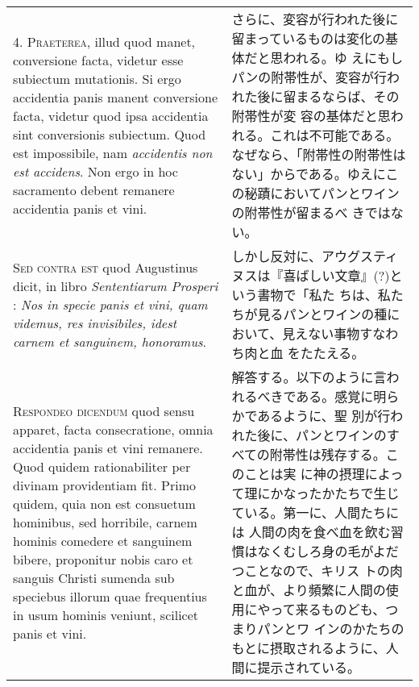\documentclass[10pt]{jsarticle} %
\begin{document}
\begin{longtable}{p{21em}p{21em}}
\\



4. {\scshape Praeterea}, illud quod manet, conversione facta, videtur
esse subiectum mutationis. Si ergo accidentia panis manent conversione
facta, videtur quod ipsa accidentia sint conversionis subiectum. Quod
est impossibile, nam {\itshape accidentis non est accidens}. Non ergo
in hoc sacramento debent remanere accidentia panis et vini.

&

さらに、変容が行われた後に留まっているものは変化の基体だと思われる。ゆ
えにもしパンの附帯性が、変容が行われた後に留まるならば、その附帯性が変
容の基体だと思われる。これは不可能である。なぜなら、「附帯性の附帯性は
ない」からである。ゆえにこの秘蹟においてパンとワインの附帯性が留まるべ
きではない。



\\



{\scshape Sed contra est} quod Augustinus dicit, in libro {\itshape
Sententiarum Prosperi} : {\itshape Nos in specie panis et vini, quam
videmus, res invisibiles, idest carnem et sanguinem, honoramus}.

&

しかし反対に、アウグスティヌスは『喜ばしい文章』(?)という書物で「私た
ちは、私たちが見るパンとワインの種において、見えない事物すなわち肉と血
をたたえる。

\\



{\scshape Respondeo dicendum} quod sensu apparet, facta consecratione,
omnia accidentia panis et vini remanere. Quod quidem rationabiliter
per divinam providentiam fit. Primo quidem, quia non est consuetum
hominibus, sed horribile, carnem hominis comedere et sanguinem bibere,
proponitur nobis caro et sanguis Christi sumenda sub speciebus illorum
quae frequentius in usum hominis veniunt, scilicet panis et vini.


&

解答する。以下のように言われるべきである。感覚に明らかであるように、聖
別が行われた後に、パンとワインのすべての附帯性は残存する。このことは実
に神の摂理によって理にかなったかたちで生じている。第一に、人間たちには
人間の肉を食べ血を飲む習慣はなくむしろ身の毛がよだつことなので、キリス
トの肉と血が、より頻繁に人間の使用にやって来るものども、つまりパンとワ
インのかたちのもとに摂取されるように、人間に提示されている。


\end{longtable}
\end{document}
